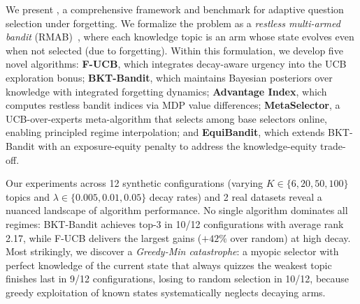 We present \textbf{\ours}, a comprehensive framework and benchmark for adaptive question selection under forgetting.
We formalize the problem as a \emph{restless multi-armed bandit} (RMAB)~\citep{whittle1988restless}, where each knowledge topic is an arm whose state evolves even when not selected (due to forgetting).
Within this formulation, we develop five novel algorithms: \textbf{F-UCB}, which integrates decay-aware urgency into the UCB exploration bonus; \textbf{BKT-Bandit}, which maintains Bayesian posteriors over knowledge with integrated forgetting dynamics; \textbf{Advantage Index}, which computes restless bandit indices via MDP value differences; \textbf{MetaSelector}, a UCB-over-experts meta-algorithm that selects among base selectors online, enabling principled regime interpolation; and \textbf{EquiBandit}, which extends BKT-Bandit with an exposure-equity penalty to address the knowledge-equity trade-off.

Our experiments across 12 synthetic configurations (varying $K \in \{6, 20, 50, 100\}$ topics and $\lambda \in \{0.005, 0.01, 0.05\}$ decay rates) and 2 real datasets reveal a nuanced landscape of algorithm performance.
No single algorithm dominates all regimes: BKT-Bandit achieves top-3 in 10/12 configurations with average rank 2.17, while F-UCB delivers the largest gains ($+42\%$ over random) at high decay.
Most strikingly, we discover a \emph{Greedy-Min catastrophe}: a myopic selector with perfect knowledge of the current state that always quizzes the weakest topic finishes last in 9/12 configurations, losing to random selection in 10/12, because greedy exploitation of known states systematically neglects decaying arms.

